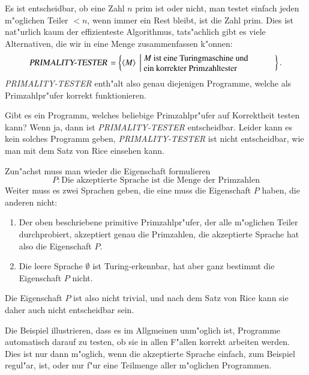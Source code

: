 \begin{beispiel} Es ist entscheidbar, ob eine Zahl $n$
prim ist oder nicht, man testet einfach jeden m"oglichen Teiler $<n$,
wenn immer ein Rest bleibt, ist die Zahl prim. Dies ist nat"urlich
kaum der effizienteste Algorithmus, tats"achlich gibt es viele Alternativen,
die wir in eine Menge zusammenfassen k"onnen:
\[
\text{\textsl{PRIMALITY-TESTER}}=
\left\{\langle M\rangle\;\left|\;
\begin{minipage}{2.15truein}
\raggedright
$M$ ist eine Turingmaschine und\\
ein korrekter Primzahltester
\end{minipage}
\right.\right\}.
\]
\textsl{PRIMALITY-TESTER} enth"alt also genau diejenigen Programme, welche
als Primzahlpr"ufer korrekt funktionieren.

Gibt es ein Programm, welches beliebige Primzahlpr"ufer auf Korrektheit
testen kann? Wenn ja, dann ist \textsl{PRIMALITY-TESTER} entscheidbar.
Leider kann es kein solches Programm geben,
\textsl{PRIMALITY-TESTER} ist nicht entscheidbar, wie man mit dem Satz
von Rice einsehen kann.

Zun"achst muss man wieder die Eigenschaft formulieren
\[
P: \text{Die akzeptierte Sprache ist die Menge der Primzahlen}
\]
Weiter muss es zwei Sprachen geben, die eine muss die Eigenschaft
$P$ haben, die anderen nicht:
\begin{enumerate}
\item
Der oben beschriebene primitive Primzahlpr"ufer, der alle m"oglichen Teiler
durchprobiert, akzeptiert genau die Primzahlen, die akzeptierte Sprache
hat also die Eigenschaft $P$.
\item 
Die leere Sprache $\emptyset$ ist Turing-erkennbar, hat aber ganz bestimmt
die Eigenschaft $P$ nicht.
\end{enumerate}
Die Eigenschaft $P$ ist also nicht trivial, und nach dem Satz von Rice
kann sie daher auch nicht entscheidbar sein.
\end{beispiel}

Die Beispiel illustrieren, dass es im Allgmeinen unm"oglich ist, Programme
automatisch darauf zu testen, ob sie in allen F"allen korrekt arbeiten
werden. Dies ist nur dann m"oglich, wenn die akzeptierte Sprache einfach,
zum Beispiel regul"ar, ist, oder nur f"ur eine Teilmenge aller m"oglichen
Programmen.
